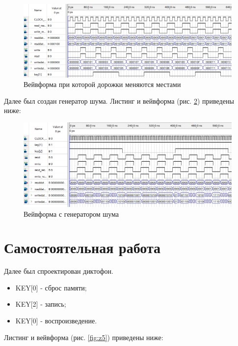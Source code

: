 \documentclass[a4paper,14pt]{article}
\begin{document}
		{\small {}}
		
		
		\begin{figure}[H]
			\centering
			\includegraphics[width=0.7\linewidth]{images/Screenshot_93}
			\caption{Вейвформа при которой дорожки меняются местами}
			\label{fig:screenshot93}
		\end{figure}
	
		Далее был создан генератор шума.
		Листинг и вейвформа (рис. \ref{fig:screenshot94}) приведены ниже:
		
		{\small {}}
		
		\begin{figure}[H]
			\centering
			\includegraphics[width=0.7\linewidth]{images/Screenshot_94}
			\caption{Вейвформа с генератором шума}
			\label{fig:screenshot94}
		\end{figure}

	\section{Самостоятельная работа}
	
		Далее был спроектирован диктофон. 
		
		\begin{itemize}
			\item KEY[0] - сброс памяти;
			
			\item KEY[2] - запись;
						
			\item KEY[0] - воспроизведение.
		\end{itemize}
	
		Листинг и вейвформа (рис. \ref{fig:z5}) приведены ниже:
		
\end{document}
